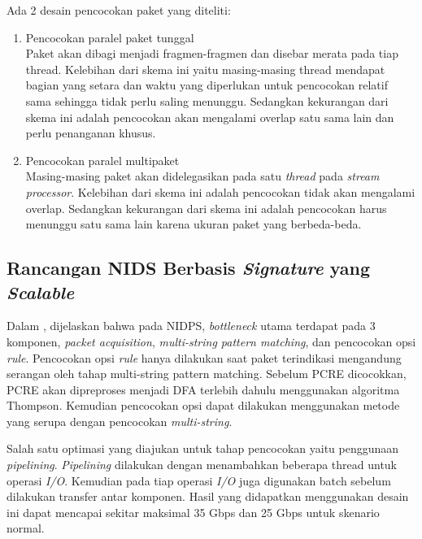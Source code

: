     Ada 2 desain pencocokan paket yang diteliti:

    \begin{enumerate}

      \item Pencocokan paralel paket tunggal \\
      Paket akan dibagi menjadi fragmen-fragmen dan disebar merata pada tiap thread. Kelebihan dari skema ini yaitu masing-masing thread mendapat bagian yang setara dan waktu yang diperlukan untuk pencocokan relatif sama sehingga tidak perlu saling menunggu. Sedangkan kekurangan dari skema ini adalah pencocokan akan mengalami overlap satu sama lain dan perlu penanganan khusus.

      \item Pencocokan paralel multipaket \\
      Masing-masing paket akan didelegasikan pada satu \emph{thread} pada \emph{stream processor}. Kelebihan dari skema ini adalah pencocokan tidak akan mengalami overlap. Sedangkan kekurangan dari skema ini adalah pencocokan harus menunggu satu sama lain karena ukuran paket yang berbeda-beda.

    \end{enumerate}

  \subsection{Rancangan NIDS Berbasis \emph{Signature} yang \emph{Scalable}}

    Dalam \parencite{kargus2012}, dijelaskan bahwa pada NIDPS, \emph{bottleneck} utama terdapat pada 3 komponen, \emph{packet acquisition}, \emph{multi-string pattern matching}, dan pencocokan opsi \emph{rule}. Pencocokan opsi \emph{rule} hanya dilakukan saat paket terindikasi mengandung serangan oleh tahap multi-string pattern matching. Sebelum PCRE dicocokkan, PCRE akan dipreproses menjadi DFA terlebih dahulu menggunakan algoritma Thompson. Kemudian pencocokan opsi dapat dilakukan menggunakan metode yang serupa dengan pencocokan \emph{multi-string}.

    Salah satu optimasi yang diajukan untuk tahap pencocokan yaitu penggunaan \emph{pipelining}. \emph{Pipelining} dilakukan dengan menambahkan beberapa thread untuk operasi \emph{I/O}. Kemudian pada tiap operasi \emph{I/O} juga digunakan batch sebelum dilakukan transfer antar komponen. Hasil yang didapatkan menggunakan desain ini dapat mencapai sekitar maksimal 35 Gbps dan 25 Gbps untuk skenario normal.

